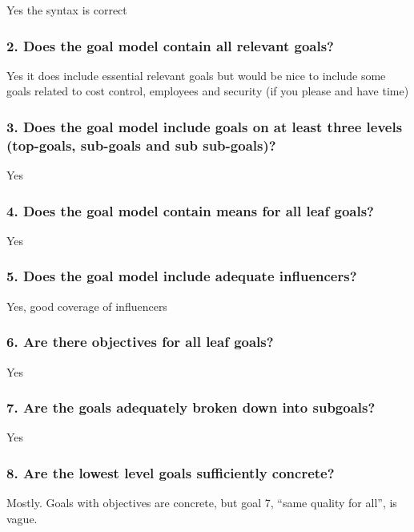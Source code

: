 \documentclass{article}
\begin{document}
Yes the syntax is correct

\subsubsection*{2. Does the goal model contain all relevant goals?}

Yes it does include essential relevant goals but would be nice to include some goals related to cost control, employees and security (if you please and have time)

\subsubsection*{3. Does the goal model include goals on at least three levels (top-goals, sub-goals and sub sub-goals)?}

Yes

\subsubsection*{4. Does the goal model contain means for all leaf goals?}

Yes

\subsubsection*{5. Does the goal model include adequate influencers?}

Yes, good coverage of influencers

\subsubsection*{6. Are there objectives for all leaf goals?}

Yes

\subsubsection*{7. Are the goals adequately broken down into subgoals?}

Yes

\subsubsection*{8. Are the lowest level goals sufficiently concrete?}

Mostly. Goals with objectives are concrete, but goal 7, ``same quality for all'', is vague.
\end{document}
